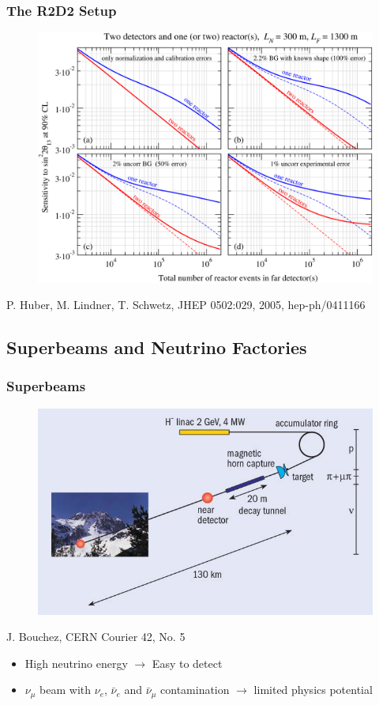 \documentclass{beamer}
\newcommand{\reference}[1]{\tiny #1 \normalsize}
\begin{document}
\begin{frame}
  \frametitle{The R2D2 Setup}

  \begin{figure}
    \includegraphics[height=7 cm]{fig/R2D2_s22th13.pdf}
  \end{figure}
  \begin{flushright}
    \reference{P. Huber, M. Lindner, T. Schwetz, JHEP 0502:029, 2005, hep-ph/0411166}
  \end{flushright}
\end{frame}


\subsection{Superbeams and Neutrino Factories}

\begin{frame}
  \frametitle{Superbeams}
  \begin{figure}
    \includegraphics[height=5 cm]{fig/cern_superbeam.jpg}
  \end{figure}
  \begin{flushright}
    \reference{J. Bouchez, CERN Courier 42, No. 5}
  \end{flushright}
  \begin{itemize}
    \item High neutrino energy $\longrightarrow$ Easy to detect
    \item $\nu_\mu$ beam with $\nu_e$, $\bar{\nu}_e$ and $\bar{\nu}_\mu$ contamination
          $\longrightarrow$ limited physics potential
  \end{itemize}
\end{frame}
\end{document}
